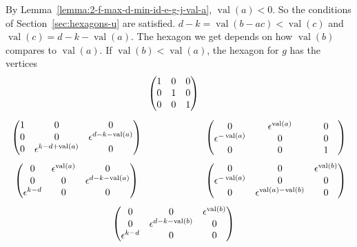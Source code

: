 \documentclass{amsart}
\theoremstyle{definition}
\def\e{\epsilon}
\def\val{\mathop{\mathrm{val}}}
\def\s{\sigma}
\def\heximagessqueezed#1#2#3#4#5#6#7{
  \heximagessqueezedcarefully{#1}{2em}{#2}{#3}{#4}{#5}{#6}{#7}
}
\def\heximagessqueezedcarefully#1#2#3#4#5#6#7#8{
  \begin{array}{ccc}
    & #3 & \\[#2]
    #5 \hspace{-#1} & & \hspace{-#1} #4 \\[2em]
    #6 \hspace{-#1} & & \hspace{-#1} #7 \\[#2]
    & #8 &
  \end{array}
}
\begin{document}


  By Lemma~\ref{lemma:2-f-max-d-min-id-e-g-j-val-a}, $\val(a) < 0$.  So the
  conditions of Section~\ref{sec:hexagons-u} are satisfied.  $d - k =
  \val(b-ac) < \val(c)$ and $\val(c) = d - k - \val(a)$.  The hexagon we get
  depends on how $\val(b)$ compares to $\val(a)$.  If $\val(b) < \val(a)$, the
  hexagon for $g$ has the vertices
  \begin{equation*}
    \heximagessqueezed{4em}
        {
          \begin{pmatrix}
            1 & 0 & 0 \\ 
            0 & 1 & 0 \\
            0 & 0 & 1
          \end{pmatrix}
        }
        {
          \begin{pmatrix}
            & \hphantom{\e^{\val(a) - \val(b)}} & \hphantom{\e^{\val(b)}} \\[-1em]
            0 & \e^{\val(a)} & 0 \\
            \e^{-\val(a)} & 0 & 0 \\
            0 & 0 & 1
          \end{pmatrix}
        }
        {
          \begin{pmatrix}
            1 & 0 & 0 \\
            0 & 0 & \e^{d - k - \val(a)} \\
            0 & \e^{k - d + \val(a)}  & 0
          \end{pmatrix} 
        }
        {
          \begin{pmatrix}
            0 & \e^{\val(a)} & 0 \\
            0 & 0 & \e^{d - k - \val(a)} \\
            \e^{k-d} & 0 & 0
           \end{pmatrix}
        }
        {
	  \begin{pmatrix}
            0 & 0 & \e^{\val(b)} \\
            \e^{-\val(a)} & 0 & 0 \\
            0 & \e^{\val(a) - \val(b)} & 0  
          \end{pmatrix}
        }
        {
          \begin{pmatrix}
            0 & 0 & \e^{\val(b)} \\
            0 & \e^{d-k-\val(b)} & 0 \\
            \e^{k-d} & 0 & 0
          \end{pmatrix}
        }
  \end{equation*}
\end{document}
